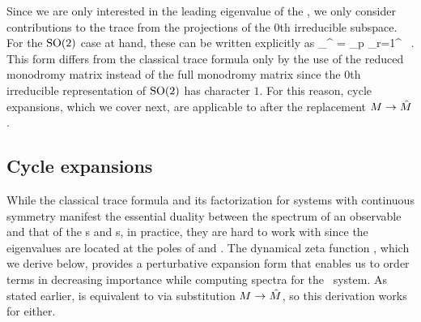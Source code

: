 \documentclass[aip,cha,
reprint,
secnumarabic,
nofootinbib, tightenlines,
nobibnotes, showkeys, showpacs,
superscriptaddress,
]{revtex4-1}
\begin{document}
{Since we are only interested in the leading eigenvalue of the \evOper , we
only consider contributions to the
trace  from the projections
 of the $0$th irreducible subspace. For the $\textrm{SO}(2)$ case at hand, these can be written
explicitly as
\beq
\sum_{}^{\infty}  = \sum_p 
\sum_{r=1}^{\infty}  \, .
This form differs from the classical trace formula
 only by the use of the reduced monodromy matrix
instead of the full monodromy matrix since
the $0$th irreducible representation of $\textrm{SO}(2)$ has character $1$. For this
reason, cycle expansions, which we cover next, are applicable
to  after the replacement
${M} \rightarrow \hat{{M}}$.

\subsection{Cycle expansions}
\label{s-CycExp}

While the classical trace formula  and its
factorization for systems with continuous symmetry  manifest
the essential duality between the spectrum of an observable and that of
the \po s and \rpo s, in practice, they are hard to work with since the
eigenvalues are located at the poles of  and
. The dynamical zeta function
, which we derive below, provides a perturbative expansion form that
enables us to order terms in decreasing importance while computing
spectra for the \twomode\ system. As stated earlier, 
is equivalent to  via substitution
${M} \rightarrow \hat{{M}}$, so this derivation works for either. 

}
\end{document}
